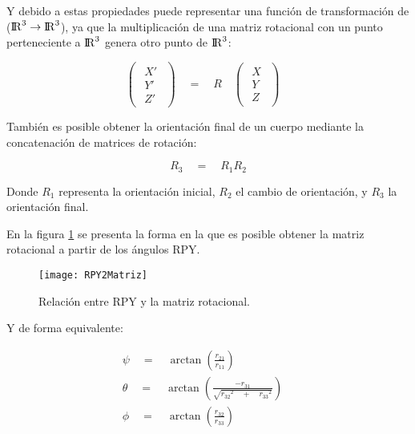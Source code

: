  Y  debido a estas propiedades  puede representar una función de transformación de (${\rm I\!R}^3 \to {\rm I\!R}^3$), ya que la multiplicación de una matriz rotacional con un punto perteneciente a ${\rm I\!R}^3$ genera otro punto de ${\rm I\!R}^3 $:
 
 \begin{equation}
 \begin{pmatrix} \begin{matrix} X' \\ Y' \\ Z' \end{matrix} \end{pmatrix}\quad =\quad R\quad \begin{pmatrix} \begin{matrix} X \\ Y \\ Z \end{matrix} \end{pmatrix}\quad 
 \label{eq:Propiedad3MatrizRotacion}
 \end{equation}
 
 
 También es posible obtener la orientación final de un cuerpo mediante la concatenación de matrices de rotación:
 
 
  \begin{equation}
 { R }_{ 3 }\quad =\quad { R }_{ 1 }{ R }_{ 2 }
 \label{eq:Propiedad4MatrizRotacion}
 \end{equation}
 
 Donde ${ R }_{ 1 }$ representa la orientación inicial, ${ R }_{ 2 }$ el cambio de orientación, y ${ R }_{ 3 }$ la orientación final.
 
 En la figura \ref{imagen:rpy2matriz} se presenta la forma en la que es posible obtener la matriz rotacional a partir de los ángulos RPY.
 
 \begin{figure}[H]
 	\centering
 	\texttt{[image: RPY2Matriz]}
 	\caption[Relación entre RPY y la matriz rotacional]{Relación entre RPY y la matriz rotacional. }
 	\label{imagen:rpy2matriz}
 \end{figure} 
 
 Y de forma equivalente:
 

\begin{align}
 \psi \quad =\quad \arctan { (\frac { { r }_{ 21 } }{ { r }_{ 11 } }) } 
 \\ \theta \quad =\quad \arctan { (\frac { -{ r }_{ 31 } }{ \sqrt { { { r }_{ 32 } }^{ 2 }\quad +\quad { { r }_{ 33 } }^{ 2 } }  } ) } \quad 
 \\ \phi \quad =\quad \arctan { (\frac { { r }_{ 32 } }{ { r }_{ 33 } } ) } \quad 
 \label{eq:Matriz2RPY}
 \end{align}

